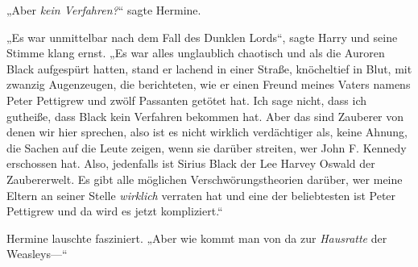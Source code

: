 „Aber \emph{kein Verfahren?}“ sagte Hermine.

„Es war unmittelbar nach dem Fall des Dunklen Lords“, sagte Harry und seine Stimme klang ernst. „Es war alles unglaublich chaotisch und als die Auroren Black aufgespürt hatten, stand er lachend in einer Straße, knöcheltief in Blut, mit zwanzig Augenzeugen, die berichteten, wie er einen Freund meines Vaters namens Peter Pettigrew und zwölf Passanten getötet hat. Ich sage nicht, dass ich gutheiße, dass Black kein Verfahren bekommen hat. Aber das sind Zauberer von denen wir hier sprechen, also ist es nicht wirklich verdächtiger als, keine Ahnung, die Sachen auf die Leute zeigen, wenn sie darüber streiten, wer John F. Kennedy erschossen hat. Also, jedenfalls ist Sirius Black der Lee Harvey Oswald der Zaubererwelt. Es gibt alle möglichen Verschwörungstheorien darüber, wer meine Eltern an seiner Stelle \emph{wirklich} verraten hat und eine der beliebtesten ist Peter Pettigrew und da wird es jetzt kompliziert.“

Hermine lauschte fasziniert. „Aber wie kommt man von da zur \emph{Hausratte} der Weasleys—“

